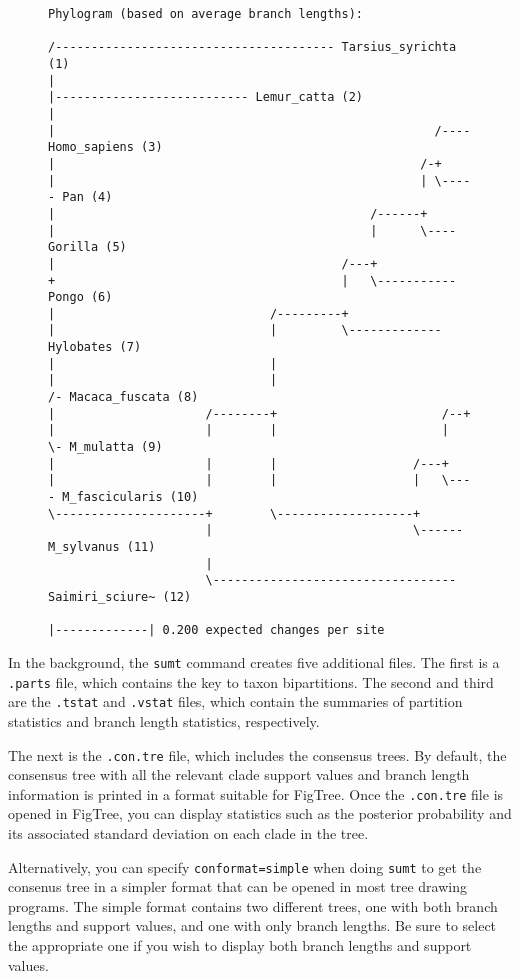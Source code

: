 \documentclass[12pt]{book}
\begin{document}
\begin{figure}[H]
\centering
\begin{BVerbatim}[fontsize=\scriptsize]
Phylogram (based on average branch lengths):

/--------------------------------------- Tarsius_syrichta (1)
|
|--------------------------- Lemur_catta (2)
|
|                                                     /---- Homo_sapiens (3)
|                                                   /-+
|                                                   | \----- Pan (4)
|                                            /------+
|                                            |      \---- Gorilla (5)
|                                        /---+
+                                        |   \----------- Pongo (6)
|                              /---------+
|                              |         \------------- Hylobates (7)
|                              |
|                              |                          /- Macaca_fuscata (8)
|                     /--------+                       /--+
|                     |        |                       |  \- M_mulatta (9)
|                     |        |                   /---+
|                     |        |                   |   \---- M_fascicularis (10)
\---------------------+        \-------------------+
                      |                            \------ M_sylvanus (11)
                      |
                      \---------------------------------- Saimiri_sciure~ (12)

|-------------| 0.200 expected changes per site
\end{BVerbatim}
\end{figure}

In the background, the \texttt{sumt} command creates five additional files. The first is a
\texttt{.parts} file, which contains the key to taxon bipartitions. The second and third are the
\texttt{.tstat} and \texttt{.vstat} files, which contain the summaries of partition statistics and
branch length statistics, respectively.

The next is the \texttt{.con.tre} file, which includes the consensus trees. By default, the
consensus tree with all the relevant clade support values and branch length information is printed
in a format suitable for FigTree. Once the \texttt{.con.tre} file is opened in FigTree, you can
display statistics such as the posterior probability and its associated standard deviation on each
clade in the tree.

Alternatively, you can specify \texttt{conformat=simple} when doing \texttt{sumt} to get the
consenus tree in a simpler format that can be opened in most tree drawing programs. The simple
format contains two different trees, one with both branch lengths and support values, and one with
only branch lengths. Be sure to select the appropriate one if you wish to display both branch
lengths and support values.
\end{document}
